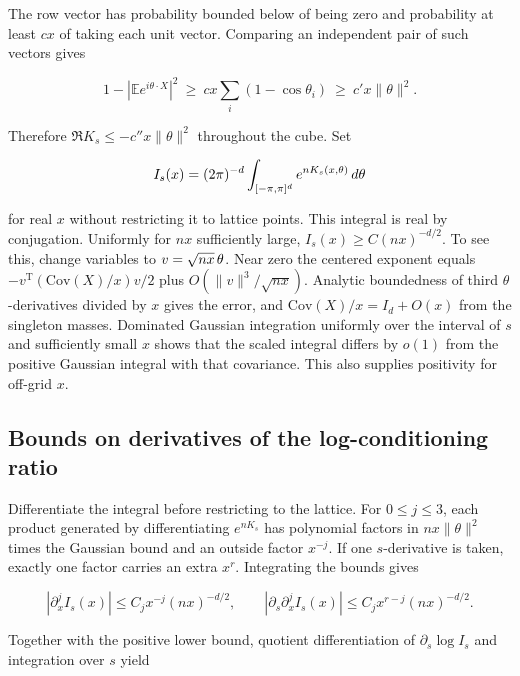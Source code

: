 \documentclass[11pt]{article}
\begin{document}
The row vector has probability bounded below of being zero and probability at least $c x$ of taking each unit vector. Comparing an independent pair of such vectors gives

\begin{equation*}
1-|\mathbb E e^{i\theta\cdot X}|^2
\ \ge\ c x\sum_i(1-\cos\theta_i)\ \ge\ c' x\lVert \theta\rVert ^2 .
\end{equation*}

Therefore $\Re K_s\le-c''x\lVert \theta\rVert ^2$ throughout the cube. Set

\begin{equation*}
I_s(x)=(2\pi)^{-d}\int_{[-\pi,\pi]^d}e^{nK_s(x,\theta)}\thinspace d\theta
\end{equation*}

for real $x$ without restricting it to lattice points. This integral is real by conjugation. Uniformly for $nx$ sufficiently large, $I_s(x)\ge C(nx)^{-d/2}$. To see this, change variables to $v=\sqrt{nx}\thinspace \theta$. Near zero the centered exponent equals $-v^\mathrm{T}(\mathrm{Cov}(X)/x)v/2$ plus $O(\lVert v\rVert ^3/\sqrt{nx})$. Analytic boundedness of third $\theta$-derivatives divided by $x$ gives the error, and $\mathrm{Cov}(X)/x=I_d+O(x)$ from the singleton masses. Dominated Gaussian integration uniformly over the interval of $s$ and sufficiently small $x$ shows that the scaled integral differs by $o(1)$ from the positive Gaussian integral with that covariance. This also supplies positivity for off-grid $x$.

\subsection{Bounds on derivatives of the log-conditioning ratio}

Differentiate the integral before restricting to the lattice. For $0\le j\le3$, each product generated by differentiating $e^{nK_s}$ has polynomial factors in $nx\lVert \theta\rVert ^2$ times the Gaussian bound and an outside factor $x^{-j}$. If one $s$-derivative is taken, exactly one factor carries an extra $x^r$. Integrating the bounds gives

\begin{equation*}
|\partial_x^jI_s(x)|\le C_j x^{-j}(nx)^{-d/2}, \qquad
|\partial_s\partial_x^j I_s(x)|\le C_j x^{r-j}(nx)^{-d/2}.
\end{equation*}

Together with the positive lower bound, quotient differentiation of $\partial_s\log I_s$ and integration over $s$ yield
\end{document}

